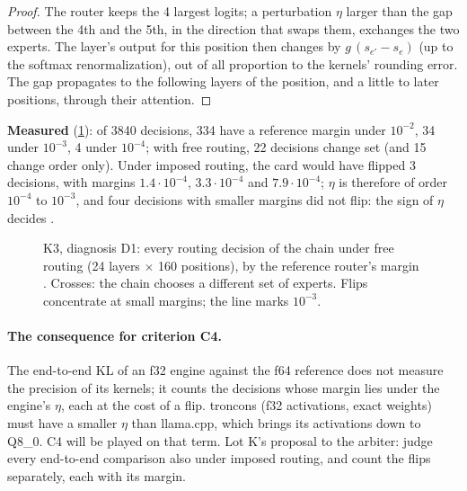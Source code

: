 \begin{proof}
The router keeps the 4 largest logits; a perturbation $\eta$ larger than the gap between the 4th and the 5th, in the direction that swaps them, exchanges the two experts. The layer's output for this position then changes by $g\,(s_{e'} - s_e)$ (up to the softmax renormalization), out of all proportion to the kernels' rounding error. The gap propagates to the following layers of the position, and a little to later positions, through their attention.
\end{proof}

\textbf{Measured} (\cref{fig:t2n-routage}): of \num{3840} decisions, 334 have a reference margin under $10^{-2}$, 34 under $10^{-3}$, 4 under $10^{-4}$; with free routing, 22 decisions change set (and 15 change order only). Under imposed routing, the card would have flipped 3 decisions, with margins $1.4\cdot10^{-4}$, $3.3\cdot10^{-4}$ and $7.9\cdot10^{-4}$; $\eta$ is therefore of order $10^{-4}$ to $10^{-3}$, and four decisions with smaller margins did not flip: the sign of $\eta$ decides \mes.

\begin{figure}[!htbp]
\centering
\GrapheNoyRoutage
\caption[K3: routing decisions and their flips]{K3, diagnosis D1: every routing decision of the chain under free routing (24 layers $\times$ 160 positions), by the reference router's margin \mes. Crosses: the chain chooses a different set of experts. Flips concentrate at small margins; the line marks $10^{-3}$.}
\label{fig:t2n-routage}
\end{figure}

\paragraph{The consequence for criterion C4.} The end-to-end KL of an f32 engine against the f64 reference does not measure the precision of its kernels; it counts the decisions whose margin lies under the engine's $\eta$, each at the cost of a flip. troncons (f32 activations, exact weights) must have a smaller $\eta$ than llama.cpp, which brings its activations down to Q8\_0. C4 will be played on that term. Lot K's proposal to the arbiter: judge every end-to-end comparison also under imposed routing, and count the flips separately, each with its margin.

